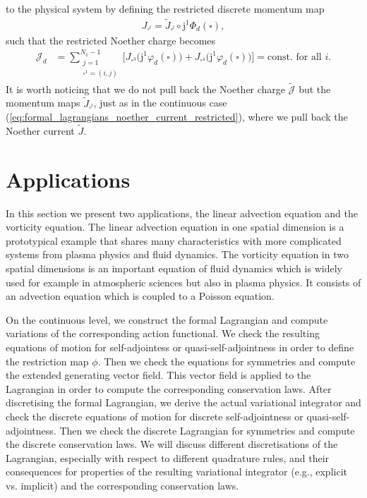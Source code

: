 \documentclass[12pt,a4paper,reqno]{article}
\begin{document}
to the physical system by defining the restricted discrete momentum map
\begin{align}
J_{\square^{l}} = \tilde{J}_{\square^{l}} \circ {\ensuremath{\mathrm{j}}}^{1} \Phi_{d} (\square) ,
\end{align}
such that the restricted Noether charge becomes
\begin{align}\label{eq:formal_lagrangians_discrete_noether_charge_restricted}
\mathcal{J}_{d} &= \sum \limits_{\substack{j=1\\ \square^{1} = (i,j)}}^{N_{1}-1} \Big[ J_{\square^{3}} \big( {\ensuremath{\mathrm{j}}}^{1} {\ensuremath{\varphi}}_{d} (\square) \big) +  J_{\square^{4}} \big( {\ensuremath{\mathrm{j}}}^{1} {\ensuremath{\varphi}}_{d} (\square) \big) \Big] = \text{const. for all $i$} .
\end{align}
It is worth noticing that we do not pull back the Noether charge $\tilde{\mathcal{J}}$ but the momentum maps $\tilde{J}_{\square^{l}}$, just as in the continuous case  (\ref{eq:formal_lagrangians_noether_current_restricted}), where we pull back the Noether current $\tilde{J}$.

\section{Applications}
\label{sec:applications}

In this section we present two applications, the linear advection equation and the vorticity equation.
The linear advection equation in one spatial dimension is a prototypical example that shares many characteristics with more complicated systems from plasma physics and fluid dynamics.
The vorticity equation in two spatial dimensions is an important equation of fluid dynamics which is widely used for example in atmospheric sciences but also in plasma physics. It consists of an advection equation which is coupled to a Poisson equation.

On the continuous level, we construct the formal Lagrangian and compute variations of the corresponding action functional. We check the resulting equations of motion for self-adjointess or quasi-self-adjointness in order to define the restriction map $\phi$. Then we check the equations for symmetries and compute the extended generating vector field. This vector field is applied to the Lagrangian in order to compute the corresponding conservation laws.
After discretising the formal Lagrangian, we derive the actual variational integrator and check the discrete equations of motion for discrete self-adjointness or quasi-self-adjointness. Then we check the discrete Lagrangian for symmetries and compute the discrete conservation laws.
We will discuss different discretisations of the Lagrangian, especially with respect to different quadrature rules, and their consequences for properties of the resulting variational integrator (e.g., explicit vs. implicit) and the corresponding conservation laws.
\end{document}
